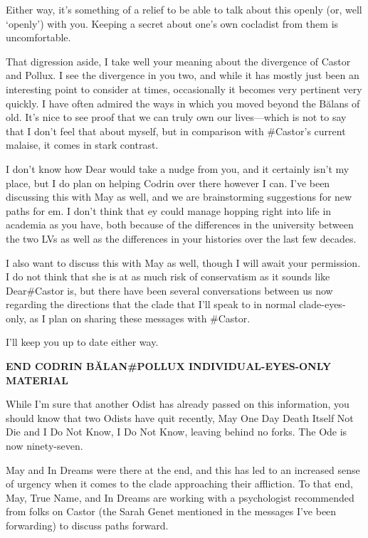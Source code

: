 Either way, it's something of a relief to be able to talk about this openly (or, well `openly') with you. Keeping a secret about one's own cocladist from them is uncomfortable.

That digression aside, I take well your meaning about the divergence of Castor and Pollux. I see the divergence in you two, and while it has mostly just been an interesting point to consider at times, occasionally it becomes very pertinent very quickly. I have often admired the ways in which you moved beyond the Bălans of old. It's nice to see proof that we can truly own our lives—which is not to say that I don't feel that about myself, but in comparison with \#Castor's current malaise, it comes in stark contrast.

I don't know how Dear would take a nudge from you, and it certainly isn't my place, but I do plan on helping Codrin over there however I can. I've been discussing this with May as well, and we are brainstorming suggestions for new paths for em. I don't think that ey could manage hopping right into life in academia as you have, both because of the differences in the university between the two LVs as well as the differences in your histories over the last few decades.

I also want to discuss this with May as well, though I will await your permission. I do not think that she is at as much risk of conservatism as it sounds like Dear\#Castor is, but there have been several conversations between us now regarding the directions that the clade that I'll speak to in normal clade-eyes-only, as I plan on sharing these messages with \#Castor.

I'll keep you up to date either way.

\begin{center}
\textbf{END CODRIN BĂLAN\#POLLUX INDIVIDUAL-EYES-ONLY MATERIAL}
\end{center}

\noindent While I'm sure that another Odist has already passed on this information, you should know that two Odists have quit recently, May One Day Death Itself Not Die and I Do Not Know, I Do Not Know, leaving behind no forks. The Ode is now ninety-seven.

May and In Dreams were there at the end, and this has led to an increased sense of urgency when it comes to the clade approaching their affliction. To that end, May, True Name, and In Dreams are working with a psychologist recommended from folks on Castor (the Sarah Genet mentioned in the messages I've been forwarding) to discuss paths forward.

